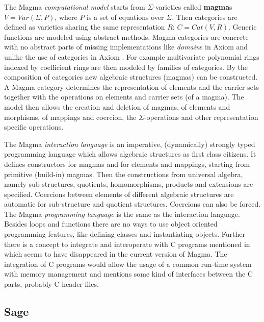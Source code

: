 \documentclass{llncs}
\begin{document}
The Magma {\em computational model} starts from $\Sigma$-varieties
called {\bf magma}s $V = Var(\Sigma,P)$, where $P$ is a set of
equations over $\Sigma$. Then categories are defined as varieties
sharing the same representation $R$: $C = Cat(V,R)$. Generic functions
are modeled using abstract methods.
Magma categories are concrete with no abstract parts of missing
implementations like {\em domain}s in Axiom and unlike the use of
categories in Axiom \cite{JenksSutor:1992}.  For example multivariate
polynomial rings indexed by coefficient rings are then modeled by
families of categories.  By the composition of categories new algebraic
structures (magmas) can be constructed. A Magma category determines
the representation of elements and the carrier sets together with the
operations on elements and carrier sets (of a magma).
%
The model then allows the creation and deletion of magmas, of elements
and morphisms, of mappings and coercion, the $\Sigma$-operations and
other representation specific operations.

The Magma {\em interaction language} is an imperative, (dynamically)
strongly typed programming language which allows algebraic structures
as first class citizens. It defines constructors for magmas and for
elements and mappings, starting from primitive (build-in) magmas.
Then the constructions from universal algebra, namely sub-structures,
quotients, homomorphisms, products and extensions are specified.
Coercions between elements of different algebraic structures are
automatic for sub-structure and quotient structures.  Coercions can
also be forced. %
The Magma {\em programming language} is the same as the interaction
language. 
%
Besides loops and functions there are no ways to use object oriented
programming features, like defining classes and instantiating objects.
%
Further there is a concept to integrate and interoperate
with C programs mentioned in \cite{BosmaCannonMatthews:1994} which
seems to have disappeared in the current version of Magma.  The
integration of C programs would allow the usage of a common run-time
system with memory management and mentions some kind of interfaces
between the C parts, probably C header files.


\subsection{Sage} %
\label{sec:sage}
\end{document}
